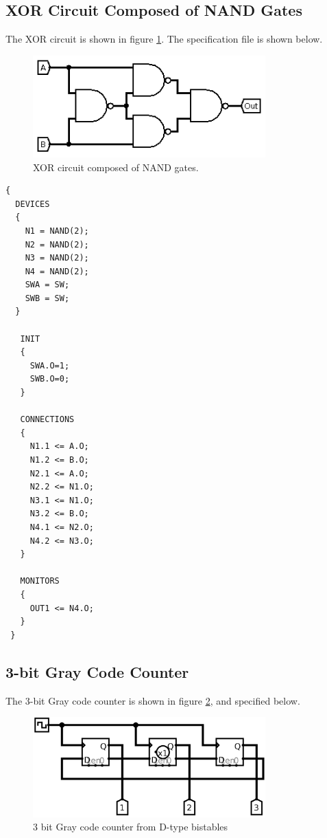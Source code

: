\documentclass[a4paper,11pt]{article}  %
\begin{document}
\subsection{XOR Circuit Composed of NAND Gates}

The XOR circuit is shown in figure \ref{fig:xornand}. The
specification file is shown below.

\begin{figure}[!h]
  \begin{center}
    \includegraphics[width=0.8\textwidth]{XORfromNAND.png}
  \end{center}
  \caption{XOR circuit composed of NAND gates.}
  \label{fig:xornand}
\end{figure}

\begin{lstlisting}
{
  DEVICES
  {
    N1 = NAND(2);
    N2 = NAND(2);
    N3 = NAND(2);
    N4 = NAND(2);
    SWA = SW;
    SWB = SW;
  }

   INIT
   {
     SWA.O=1;
     SWB.O=0;
   }

   CONNECTIONS
   {
     N1.1 <= A.O;
     N1.2 <= B.O;
     N2.1 <= A.O;
     N2.2 <= N1.O;
     N3.1 <= N1.O;
     N3.2 <= B.O;
     N4.1 <= N2.O;
     N4.2 <= N3.O;
   }

   MONITORS
   {
     OUT1 <= N4.O;
   }
 }

\end{lstlisting}

\subsection{3-bit Gray Code Counter}

The 3-bit Gray code counter is shown in figure \ref{fig:3bitgray}, and
specified below.

\begin{figure}[!h]
  \begin{center}
    \includegraphics[width=0.8\textwidth]{3bitGrayCounter.png}
  \end{center}
  \caption{3 bit Gray code counter from D-type bistables}
  \label{fig:3bitgray}
\end{figure}
\end{document}
